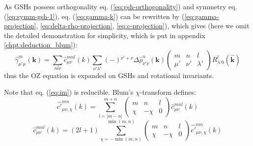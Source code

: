 As \acs{GSH}s possess orthogonality eq. (\ref{eq:gsh-orthogonality})
and symmetry eq. (\ref{eq:symm-gsh-1}), eq. (\ref{eq:gamma-k}) can
be rewritten by (\ref{eq:gamma-projection}, \ref{eq:delta-rho-projection},
\ref{eq:c-projection}), which gives (here we omit the detailed demonstration
for simplicity, which is put in appendix \ref{chpt:deduction_blum}):
\begin{equation}
\hat{\gamma}_{\mu'\mu}^{m}(\mathbf{k})=\sum_{nl\nu}\hat{c}_{\mu\nu}^{mnl}(k)\sum_{\nu'\lambda'}\left(-\right){}^{\nu'+\nu}\Delta\hat{\rho}_{\underline{\nu'}\underline{\nu}}^{n}(\mathbf{k})\left(\begin{array}{ccc}
m & n & l\\
\mu' & \nu' & \lambda'
\end{array}\right)R_{\lambda'0}^{l}(\hat{\mathbf{k}})\label{eq:im}
\end{equation}
thus the \acs{OZ} equation is expanded on \acs{GSH}s and rotational
invariants.

Note that eq. (\ref{eq:im}) is reducible. Blum's $\chi$-transform
\citep{Blum_II} defines:
\begin{equation}
\hat{c'}_{\mu\nu,\chi}^{mn}(k)=\sum_{l=\left|m-n\right|}^{m+n}\left(\begin{array}{ccc}
m & n & l\\
\chi & -\chi & 0
\end{array}\right)\hat{c}_{\mu\nu}^{mnl}(k)
\end{equation}
\begin{equation}
\hat{c}_{\mu\nu}^{mnl}(k)=\left(2l+1\right)\sum_{\chi=-\min(m,n)}^{\min(m,n)}\left(\begin{array}{ccc}
m & n & l\\
\chi & -\chi & 0
\end{array}\right)\hat{c'}_{\mu\nu,\chi}^{mn}(k)\label{eq:c-p}
\end{equation}

